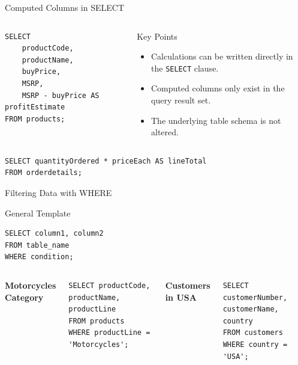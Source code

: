 \documentclass[aspectratio=169,11pt]{beamer}
\newcommand{\kw}[1]{\textcolor{sqlblue}{\texttt{#1}}}
\newcommand{\minihead}[1]{\vspace{2pt}\textbf{#1}\vspace{2pt}}
\begin{document}
\begin{frame}[fragile]{Computed Columns in SELECT}
\begin{columns}[T]
\begin{lstlisting}
SELECT
    productCode,
    productName,
    buyPrice,
    MSRP,
    MSRP - buyPrice AS profitEstimate
FROM products;
\end{lstlisting}
\begin{block}{Key Points}
\begin{itemize}
  \item Calculations can be written directly in the \kw{SELECT} clause.
  \item Computed columns only exist in the query result set.
  \item The underlying table schema is not altered.
\end{itemize}
\end{block}
\end{columns}
\vspace{4pt}
\begin{lstlisting}
SELECT quantityOrdered * priceEach AS lineTotal
FROM orderdetails;
\end{lstlisting}
\end{frame}

\begin{frame}[fragile]{Filtering Data with WHERE}
\begin{block}{General Template}
\begin{lstlisting}
SELECT column1, column2
FROM table_name
WHERE condition;
\end{lstlisting}
\end{block}
\begin{columns}[T]
\minihead{Motorcycles Category}
\begin{lstlisting}
SELECT productCode, productName, productLine
FROM products
WHERE productLine = 'Motorcycles';
\end{lstlisting}
\minihead{Customers in USA}
\begin{lstlisting}
SELECT customerNumber, customerName, country
FROM customers
WHERE country = 'USA';
\end{lstlisting}
\end{columns}
\end{frame}
\end{document}
